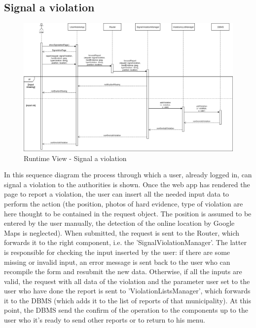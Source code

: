         \subsection{Signal a violation}
        \begin{figure}[H]
            \includegraphics[scale=0.35]{dd/resources/images/RuntimeView-SignalViolation}
            \caption{Runtime View - Signal a violation}        
        \end{figure}
        In this sequence diagram the process through which a user, already
        logged in, can signal a violation to the authorities is shown. Once the
        web app has rendered the page to report a violation, the user can insert
        all the needed input data to perform the action (the position, photos of
        hard evidence, type of violation are here thought to be contained in the
        request object. The position is assumed to be entered by the user
        manually, the detection of the online location by Google Maps is
        neglected). When submitted, the request is sent to the Router, which
        forwards it to the right component, i.e. the 'SignalViolationManager'.
        The latter is responsible for checking the input inserted by the user:
        if there are some missing or invalid input, an error message is sent
        back to the user who can recompile the form and resubmit the new data.
        Otherwise, if all the inputs are valid, the request with all data of the
        violation and the parameter user set to the user who have done the
        report is sent to 'ViolationListsManager', which forwards it to the DBMS
        (which adds it to the list of reports of that municipality). At this
        point, the DBMS send the confirm of the operation to the components up
        to the user who it's ready to send other reports or to return to his
        menu.

